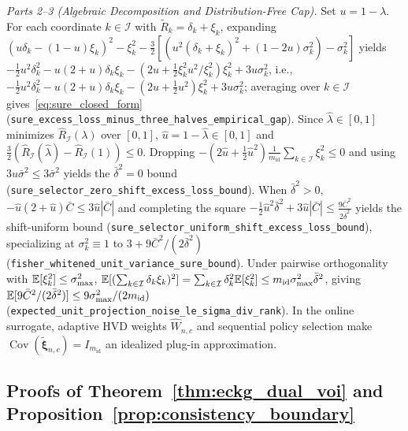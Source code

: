 \emph{Parts 2--3 (Algebraic Decomposition and Distribution-Free Cap).} Set $u = 1 - \lambda$. For each coordinate $k \in \mathcal{I}$ with $\tilde{R}_k = \delta_k + \xi_k$, expanding $(u \delta_k - (1 - u)\xi_k)^2 - \xi_k^2 - \frac{3}{2}[(u^2(\delta_k + \xi_k)^2 + (1 - 2u)\sigma_k^2) - \sigma_k^2]$ yields $-\frac{1}{2}u^2 \delta_k^2 - u(2 + u)\delta_k\xi_k - (2u + \frac{1}{2}\xi_k^2 u^2/\xi_k^2)\xi_k^2 + 3u\sigma_k^2$, i.e., $-\frac{1}{2}u^2 \delta_k^2 - u(2 + u)\delta_k\xi_k - (2u + \frac{1}{2}u^2)\xi_k^2 + 3u\sigma_k^2$; averaging over $k \in \mathcal{I}$ gives~\eqref{eq:sure_closed_form} (\texttt{sure\_excess\_loss\_minus\_three\_halves\_empirical\_gap}). Since $\hat{\lambda} \in [0, 1]$ minimizes $\widehat{R}_{\mathcal{I}}(\lambda)$ over $[0, 1]$, $\hat{u} = 1 - \hat{\lambda} \in [0, 1]$ and $\frac{3}{2}(\widehat{R}_{\mathcal{I}}(\hat{\lambda}) - \widehat{R}_{\mathcal{I}}(1)) \le 0$. Dropping $-(2\hat{u} + \frac{1}{2}\hat{u}^2)\frac{1}{m_{\mathrm{id}}}\sum_{k \in \mathcal{I}}\xi_k^2 \le 0$ and using $3\hat{u}\bar{\sigma}^2 \le 3\bar{\sigma}^2$ yields the $\bar{\delta}^2 = 0$ bound (\texttt{sure\_selector\_zero\_shift\_excess\_loss\_bound}). When $\bar{\delta}^2 > 0$, $-\hat{u}(2 + \hat{u})\bar{C} \le 3\hat{u}|\bar{C}|$ and completing the square $-\frac{1}{2}\hat{u}^2 \bar{\delta}^2 + 3\hat{u}|\bar{C}| \le \frac{9\bar{C}^2}{2\bar{\delta}^2}$ yields the shift-uniform bound (\texttt{sure\_selector\_uniform\_shift\_excess\_loss\_bound}), specializing at $\sigma_k^2 \equiv 1$ to $3 + 9\bar{C}^2/(2\bar{\delta}^2)$ (\texttt{fisher\_whitened\_unit\_variance\_sure\_bound}). Under pairwise orthogonality with $\mathbb{E}[\xi_k^2] \le \sigma_{\max}^2$, $\mathbb{E}[(\sum_{k \in \mathcal{I}} \delta_k\xi_k)^2] = \sum_{k \in \mathcal{I}} \delta_k^2 \mathbb{E}[\xi_k^2] \le m_{\mathrm{id}}\sigma_{\max}^2 \bar{\delta}^2$, giving $\mathbb{E}[9\bar{C}^2/(2\bar{\delta}^2)] \le 9\sigma_{\max}^2/(2 m_{\mathrm{id}})$ (\texttt{expected\_unit\_projection\_noise\_le\_sigma\_div\_rank}). In the online surrogate, adaptive HVD weights $\hat{W}_{n,c}$ and sequential policy selection make $\operatorname{Cov}(\tilde{\bm{\xi}}_{n,c}) = I_{m_{\mathrm{id}}}$ an idealized plug-in approximation.
\Halmos\endproof

\subsection{Proofs of Theorem~\ref*{thm:eckg_dual_voi} and Proposition~\ref*{prop:consistency_boundary}}\label{ec:kg_correction}\label{ec:cascade_rank}

